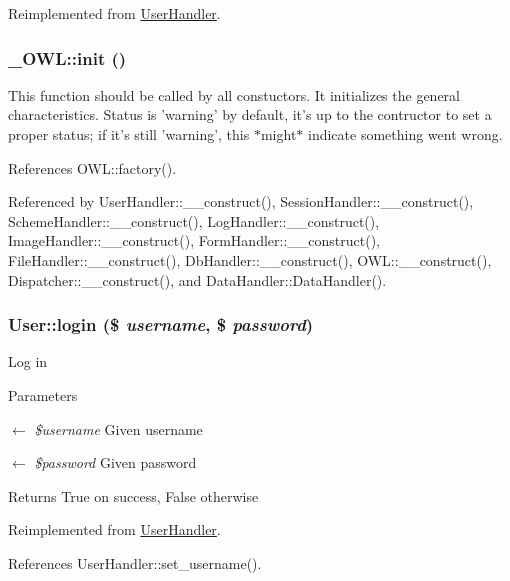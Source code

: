 Reimplemented from \hyperlink{classUserHandler_a76e8c8b88c8d92f2d03645e810b9253c}{UserHandler}.

\subsubsection[{init}]{\setlength{\rightskip}{0pt plus 5cm}\_\-OWL::init ()}\label{class__OWL_ae0ef3ded56e8a6b34b6461e5a721cd3e}
This function should be called by all constuctors. It initializes the general characteristics. Status is 'warning' by default, it's up to the contructor to set a proper status; if it's still 'warning', this $\ast$might$\ast$ indicate something went wrong. 

References OWL::factory().



Referenced by UserHandler::\_\-\_\-construct(), SessionHandler::\_\-\_\-construct(), SchemeHandler::\_\-\_\-construct(), LogHandler::\_\-\_\-construct(), ImageHandler::\_\-\_\-construct(), FormHandler::\_\-\_\-construct(), FileHandler::\_\-\_\-construct(), DbHandler::\_\-\_\-construct(), OWL::\_\-\_\-construct(), Dispatcher::\_\-\_\-construct(), and DataHandler::DataHandler().

\subsubsection[{login}]{\setlength{\rightskip}{0pt plus 5cm}User::login (\$ {\em username}, \/  \$ {\em password})}\label{classUser_a2c4fae5935ebf84e787126795bf42988}
Log in


\begin{DoxyParams}{Parameters}
\item[\mbox{$\leftarrow$} {\em \$username}]Given username \item[\mbox{$\leftarrow$} {\em \$password}]Given password \end{DoxyParams}
\begin{DoxyReturn}{Returns}
True on success, False otherwise 
\end{DoxyReturn}


Reimplemented from \hyperlink{classUserHandler_abf6562660ee8ec1663afe08550a63643}{UserHandler}.



References UserHandler::set\_\-username().

